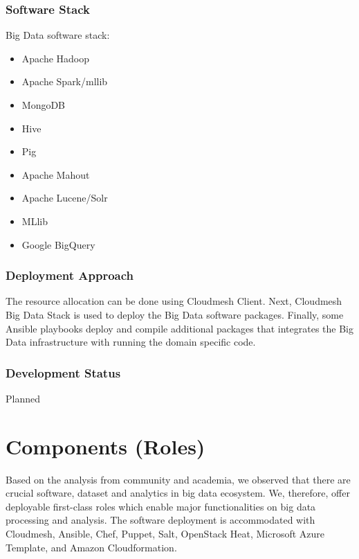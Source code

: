\documentclass[9pt,twocolumn,twoside]{styles/osajnl}
\begin{document}
\subsubsection{Software Stack}

Big Data software stack:

\begin{itemize}
\item Apache Hadoop
\item Apache Spark/mllib
\item MongoDB
\item Hive
\item Pig
\item Apache Mahout
\item Apache Lucene/Solr
\item MLlib
\item Google BigQuery
\end{itemize}

\subsubsection{Deployment Approach}

The resource allocation can be done using Cloudmesh Client.  Next,
Cloudmesh Big Data Stack is used to deploy the Big Data software
packages.  Finally, some Ansible playbooks deploy and compile
additional packages that integrates the Big Data infrastructure with
running the domain specific code.

\subsubsection{Development Status}

Planned




\section{Components (Roles)}

Based on the analysis from community and academia, we observed that
there are crucial software, dataset and analytics in big data
ecosystem. We, therefore, offer deployable first-class roles which
enable major functionalities on big data processing and analysis. The
software deployment is accommodated with Cloudmesh, Ansible, Chef,
Puppet, Salt, OpenStack Heat, Microsoft Azure Template, and Amazon
Cloudformation.
\end{document}
